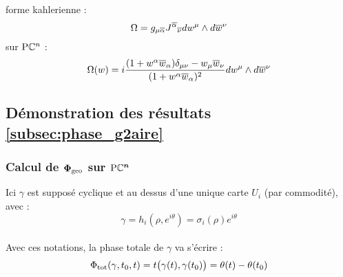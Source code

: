 forme kahlerienne :
\begin{equation}
	\Omega = g_{\mu \overline{\alpha}} {J^{\overline{\alpha}}}_{\overline{\nu}} dw^\mu \wedge d\overline{w}^\nu
\end{equation}
sur $\text{\normalfont P}\mathbb{C}^{n}$ :
\[\Omega(w) = i\frac{(1+w^\alpha \overline{w}_\alpha)\delta_{\mu\nu} - w_\mu \overline{w}_\nu}{(1+w^\alpha \overline{w}_\alpha)^2} dw^\mu \wedge d\overline{w}^\nu\]
\skipl



\subsection{Démonstration des résultats \cref{subsec:phase_g2aire}} \label{ann:stokes}

\subsubsection{Calcul de $\boldsymbol{\Phi_{\text{\normalfont geo}}}$ sur $\boldsymbol{\text{\normalfont P}\mathbb{C}^{n}}$} \label{ann:proj2phaseg}

Ici $\gamma$ est supposé cyclique et au dessus d'une unique carte $U_i$ (par commodité), avec :
\[\gamma = h_i(\rho, e^{i\theta}) = \sigma_i(\rho) e^{i\theta}\]
\\
Avec ces notations, la phase totale de $\gamma$ va s'écrire :
\[\Phi_{\text{\normalfont tot}}(\gamma, t_0, t) = t\big( \gamma(t), \gamma(t_0) \big) = \theta(t) - \theta(t_0)\]
\\

